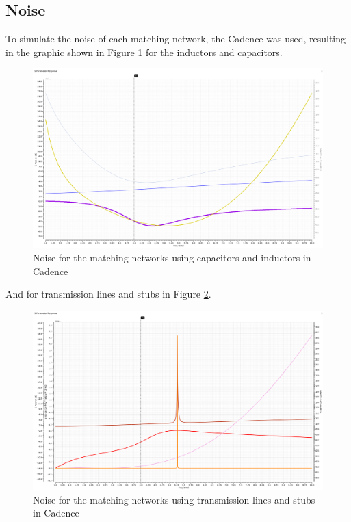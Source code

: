 \subsection{Noise}

To simulate the noise of each matching network, the Cadence was used, resulting in the graphic shown in Figure \ref{fig:NoiseLC} for the inductors and capacitors.

\begin{figure}[H]
    \centering
    \includegraphics*[scale = 0.3]{Images/noiseLC.png}
    \caption{Noise for the matching networks using capacitors and inductors in Cadence}
    \label{fig:NoiseLC}
\end{figure}

And for transmission lines and stubs in Figure \ref{fig:NoiseLS}.

\begin{figure}[H]
    \centering
    \includegraphics*[scale = 0.3]{Images/noiseLS.png}
    \caption{Noise for the matching networks using transmission lines and stubs in Cadence}
    \label{fig:NoiseLS}
\end{figure}